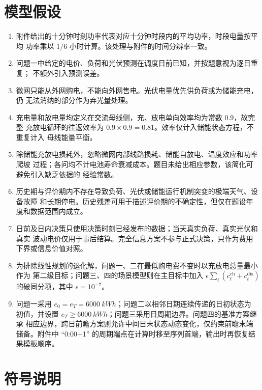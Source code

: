 \documentclass[withoutpreface,bwprint]{cumcmthesis}
\begin{document}
\section{模型假设}

\begin{enumerate}
  \item 附件给出的十分钟时刻功率代表对应十分钟时段内的平均功率，时段电量按平均
  功率乘以 $1/6$ 小时计算。该处理与附件的时间分辨率一致。
  \item 问题一中给定的电价、负荷和光伏预测在调度日前已知，并按题意视为逐日重复；
  不额外引入预测误差。
  \item 微网只能从外网购电，不能向外网售电。光伏电量优先供负荷或为储能充电，仍
  无法消纳的部分作为弃光量处理。
  \item 充电量和放电量均定义在交流母线侧，充、放电单向效率均为常数 $0.9$，故完整
  充放电循环的往返效率为 $0.9\times0.9=0.81$。效率仅计入储能状态方程，不重复计入
  母线能量平衡。
  \item 除储能充放电损耗外，忽略微网内部线路损耗、储能自放电、温度效应和功率爬坡
  过程；各问均不计电池寿命衰减成本。题目未给出相应参数，该简化可避免引入缺乏依据的
  经验常数。
  \item 历史期与评价期内不存在导致负荷、光伏或储能运行机制突变的极端天气、设备故障
  和长期停电。历史残差可用于描述评价期的不确定性，但仅在题设年度和数据范围内成立。
  \item 日前及日内决策只使用决策时刻已经发布的数据；当天真实负荷、真实光伏和真实
  波动电价仅用于事后结算。完全信息方案不参与正式决策，只作为费用下界或信息价值对照。
  \item 为排除线性规划的退化解，问题一、二在最低购电费不变时以充放电总量最小作为
  第二级目标；问题三、四的场景模型则在主目标中加入
  $\epsilon\sum_t(c_t^{\mathrm{ch}}+c_t^{\mathrm{dis}})$ 的破同分项，其中 $\epsilon=10^{-7}$。
  \item 问题一采用 $e_0=e_T=\SI{6000}{kWh}$；问题二以相邻日期连续传递的日初状态为
  初值，并设置 $e_T\ge\SI{6000}{kWh}$；问题三采用日周期边界。问题四的基准方案继承
  相应边界，跨日前瞻方案则允许中间日末状态动态变化，仅约束前瞻末端储备。附件中
  ``0:00+1'' 的周期端点在计算时移至序列首端，输出时再恢复结果模板顺序。
\end{enumerate}

\section{符号说明}
\end{document}

